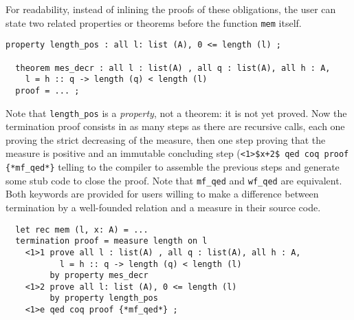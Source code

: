 For readability, instead of inlining the proofs of these obligations,
the user can state two related properties or theorems before the
function {\tt mem} itself.

\noindent
{\scriptsize
\begin{lstlisting}[frame=none]
  property length_pos : all l: list (A), 0 <= length (l) ;

  theorem mes_decr : all l : list(A) , all q : list(A), all h : A,
    l = h :: q -> length (q) < length (l)
  proof = ... ;
\end{lstlisting}
}

Note that {\tt length\_pos} is a {\em property}, not a theorem: it is not
yet proved.
Now the termination proof consists in as many steps as there are
recursive calls, each one proving the strict decreasing of the measure,
then one step proving that the measure is positive and an immutable
concluding step (\lstinline"<1>$x+2$ qed coq proof {*mf_qed*}" telling to the
compiler to assemble the previous steps and generate some stub code to close
the proof. Note that {\tt mf\_qed} and {\tt wf\_qed} are equivalent. Both
keywords are provided for users willing to make a difference between
termination by a well-founded relation and a measure in their source code.

\noindent
{\scriptsize
\begin{lstlisting}
  let rec mem (l, x: A) = ...
  termination proof = measure length on l
    <1>1 prove all l : list(A) , all q : list(A), all h : A,
           l = h :: q -> length (q) < length (l)
         by property mes_decr
    <1>2 prove all l: list (A), 0 <= length (l)
         by property length_pos
    <1>e qed coq proof {*mf_qed*} ;
\end{lstlisting}
}

